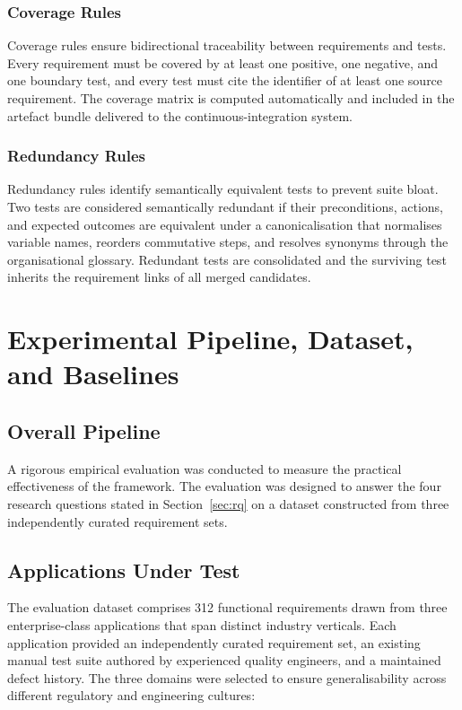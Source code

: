 \documentclass[conference]{IEEEtran}
\begin{document}
\subsubsection{Coverage Rules}
Coverage rules ensure bidirectional traceability between requirements and tests. Every requirement must be covered by at least one positive, one negative, and one boundary test, and every test must cite the identifier of at least one source requirement. The coverage matrix is computed automatically and included in the artefact bundle delivered to the continuous-integration system.

\subsubsection{Redundancy Rules}
Redundancy rules identify semantically equivalent tests to prevent suite bloat. Two tests are considered semantically redundant if their preconditions, actions, and expected outcomes are equivalent under a canonicalisation that normalises variable names, reorders commutative steps, and resolves synonyms through the organisational glossary. Redundant tests are consolidated and the surviving test inherits the requirement links of all merged candidates.

\section{Experimental Pipeline, Dataset, and Baselines}
\label{sec:dataset}

\subsection{Overall Pipeline}

A rigorous empirical evaluation was conducted to measure the practical effectiveness of the framework. The evaluation was designed to answer the four research questions stated in Section~\ref{sec:rq} on a dataset constructed from three independently curated requirement sets.

\subsection{Applications Under Test}

The evaluation dataset comprises 312 functional requirements drawn from three enterprise-class applications that span distinct industry verticals. Each application provided an independently curated requirement set, an existing manual test suite authored by experienced quality engineers, and a maintained defect history. The three domains were selected to ensure generalisability across different regulatory and engineering cultures:
\end{document}

